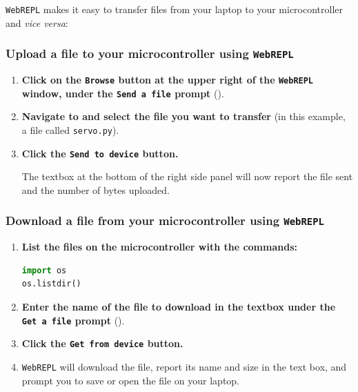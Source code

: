 \texttt{WebREPL} makes it easy to transfer files from your laptop to your microcontroller and \textit{vice versa}:

\subsubsection{\howto Upload a file to your microcontroller using \texttt{WebREPL}}
\begin{enumerate}
	\item \textbf{Click on the \texttt{Browse} button at the upper right of the \texttt{WebREPL} window, under the \texttt{Send a file} prompt} ().
	\item \textbf{Navigate to and select the file you want to transfer} (in this example, a file called \texttt{servo.py}).
	\item \textbf{Click the \texttt{Send to device} button.}

	The textbox at the bottom of the right side panel will now report the file sent and the number of bytes uploaded.
\end{enumerate}


\subsubsection{\howto Download a file from your microcontroller using \texttt{WebREPL}}
\begin{enumerate}
	\item \textbf{List the files on the microcontroller with the \Micropython commands:}
\begin{lstlisting}[language=Python]
import os
os.listdir()
\end{lstlisting}

	\item \textbf{\textbf{Enter the name of the file to download in the textbox under the \texttt{Get a file} prompt}} ().


	\item \textbf{Click the \texttt{Get from device} button.}
	\item \texttt{WebREPL} will download the file, report its name and size in the text box, and prompt you to save or open the file on your laptop.
	\end{enumerate}

